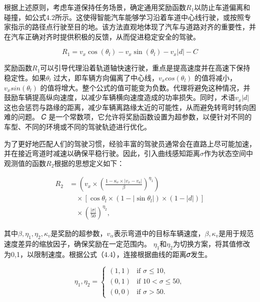 根据上述原则，考虑车道保持任务场景，确定通用奖励函数\(𝑅_1\)以防止车道偏离和碰撞，如公式4.2所示。这使得智能汽车能够学习沿着车道中心线行驶，或按照专家指示的路径点行驶至目的地。该方法直观地体现了汽车与道路对齐的重要性，并在汽车正确对齐时提供积极的反馈，从而促进稳定安全的驾驶。

\begin{equation}
	R_1 = v_x \cos(\theta_l) - v_x \sin(\theta_l) - v_x \lvert d \rvert - C
\end{equation}

奖励函数\(𝑅_1\)可以引导代理沿着轨道轴快速行驶，重点是提高速度并在高速下保持稳定性。如果\(𝜃_𝑙\) 过大，即车辆方向偏离了中心线，\(𝑣_𝑥 cos(𝜃_𝑙)\) 的值将减小，\(𝑣_𝑥 sin(𝜃_𝑙)\) 的值将增大。整个公式的值可能变为负数。代理将避免这种情况，并鼓励车辆提高纵向速度，以减少车辆横向速度造成的功率损失。同时，术语\(𝑣_𝑥|𝑑|\)这也会惩罚与路缘的距离，减少车辆离路缘太近的可能性，从而避免转弯时转向困难的问题。 𝐶 是一个常数项，它允许将奖励函数设置为超参数，以便针对不同的车型、不同的环境或不同的驾驶轨迹进行优化。

为了更好地匹配人们的驾驶习惯，经验丰富的驾驶员通常会在直路上尽可能加速，并在接近弯道时减速以确保平稳行驶。因此，引入曲线感知距离\(𝜎\)作为状态空间中观测值的函数\(𝑅_2\)根据\cite{zou2021deep}的思想定义如下：

\begin{equation}
	\begin{split}
		R_2 &= \left( v_x \times \left( \frac{1 - \kappa_v \times \lvert v_x - v_a \rvert}{\beta} \right)^{\eta_1} \right) \\
		&\quad \times \left[ \cos \theta_l \times (1 - \lvert \sin \theta_l \rvert) \times (1 - \lvert d \rvert) \right] \\
		&\quad \times \left( \frac{\lvert \sigma \rvert}{50} \right)^{\eta_2},
	\end{split}
\end{equation}

其中\(𝛽,𝜂_1,𝜂_2,𝜅_𝑣\)是奖励的超参数，\(𝑣_𝛼\)表示弯道中的目标车辆速度，\(𝛽,𝜅_𝑣\)是用于规范速度差异的缩放因子，确保奖励在一定范围内。 \(𝜂_1\)和\(𝜂_2\)为切换方案，将其值修改为{0,1}，以限制速度。根据公式（4.4），连接根据曲线的距离𝜎发生。

\begin{equation}
	\eta_1, \eta_2 = 
	\begin{cases} 
		(1, 1) & \text{if } \sigma \leq 10, \\ 
		(0, 1) & \text{if } 10 < \sigma \leq 50, \\ 
		(0, 0) & \text{if } \sigma > 50. 
	\end{cases}
\end{equation}

